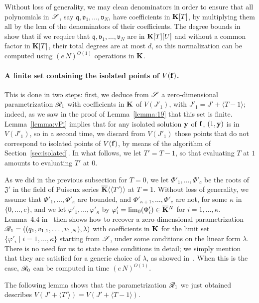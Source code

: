 \documentclass[12pt]{article}
\begin{document}
Without loss of generality, we may clean denominators in order to
ensure that all polynomials in $\mathscr{S}$, say
$\mathfrak{q},\mathfrak{v}_1,\dots,\mathfrak{v}_N$, have coefficients
in $\mathbf{K}[T]$, by multiplying them all by the lcm of the denominators
of their coefficients. The degree bounds in~\cite{Schost03} show that
if we require that $\mathfrak{q},\mathfrak{v}_1,\dots,\mathfrak{v}_N$
are in $\mathbf{K}[T][U]$ and without a common factor in $\mathbf{K}[T]$,
their total degrees are at most $d$, so this normalization can be
computed using $(e\,N)^{O(1)}$ operations in $\mathbf{K}$.

\paragraph{A finite set containing the isolated points of $V(\mathbf{f})$.}
This is done in two steps: first, we deduce from $\mathscr{S}$ a
zero-dimensional parametrization $\mathscr{R}_1$ with coefficients in $\mathbf{K}$
of $V(J'_1)$, with $J'_1 = J' + \langle T-1\rangle$; indeed, as we
saw in the proof of Lemma~\ref{lemma:19} that this set is finite.
Lemma~\ref{lemma:vPi} implies that for any isolated solution $\mathbf{y}$ of
$\mathbf{f}$, $(1,\mathbf{y})$ is in $V(J'_1)$, so in a second time, we discard from
$V(J'_1)$ those points that do not correspond to isolated points of
$V(\mathbf{f})$, by means of the algorithm of Section~\ref{sec:isolated}.  In
what follows, we let $T'=T-1$, so that evaluating $T$ at $1$
amounts to evaluating $T'$ at $0$.

As we did in the previous subsection for $T=0$, we let
$\Phi'_1,\dots,\Phi'_c$ be the roots of $\mathfrak{J}'$ in the field
of Puiseux series $\overline{\mathbf{K}}\langle\langle T'\rangle\rangle$ at
$T=1$. Without loss of generality, we assume that
$\Phi'_1,\dots,\Phi'_\kappa$ are bounded, and
$\Phi'_{\kappa+1},\dots,\Phi'_c$ are not, for some $\kappa$ in
$\{0,\dots,c\}$, and we let $\varphi'_1,\dots,\varphi'_\kappa$ by
$\varphi'_i=\lim_0(\Phi'_i)\in\overline{\mathbf{K}}{}^N$ for
$i=1,\dots,\kappa$. Lemma~4.4 in~\cite{RRS} then shows how to recover
a zero-dimensional parametrization
$\mathscr{R}_1=((q_1,v_{1,1},\dots,v_{1,N}),\lambda)$ with coefficients in
$\mathbf{K}$ for the limit set $\{\varphi'_i \mid i=1,\dots,\kappa\}$
starting from $\mathscr{S}$, under some conditions on the linear form
$\lambda$. There is no need for us to state these conditions in
detail; we simply mention that they are satisfied for a generic choice
of $\lambda$, as showed in~\cite{SaSc16}.  When this is the case,
$\mathscr{R}_0$ can be computed in time $(e\,N)^{O(1)}$.

The following lemma shows that the parametrization $\mathscr{R}_1$ we just obtained 
describes $V(J' + \langle T' \rangle)=V(J' + \langle T-1 \rangle)$.
\end{document}
